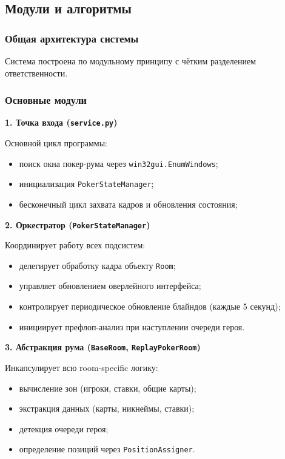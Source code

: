 \subsection{Модули и алгоритмы}

\subsubsection*{Общая архитектура системы}

Система построена по модульному принципу с чётким разделением ответственности.

\subsubsection*{Основные модули}

\textbf{1. Точка входа (\texttt{service.py})}

Основной цикл программы:
\begin{itemize}
    \item поиск окна покер-рума через \texttt{win32gui.EnumWindows};
    \item инициализация \texttt{PokerStateManager};
    \item бесконечный цикл захвата кадров и обновления состояния;
\end{itemize}

\textbf{2. Оркестратор (\texttt{PokerStateManager})}

Координирует работу всех подсистем:
\begin{itemize}
    \item делегирует обработку кадра объекту \texttt{Room};
    \item управляет обновлением оверлейного интерфейса;
    \item контролирует периодическое обновление блайндов (каждые 5 секунд);
    \item инициирует префлоп-анализ при наступлении очереди героя.
\end{itemize}

\textbf{3. Абстракция рума (\texttt{BaseRoom}, \texttt{ReplayPokerRoom})}

Инкапсулирует всю room-specific логику:
\begin{itemize}
    \item вычисление зон (игроки, ставки, общие карты);
    \item экстракция данных (карты, никнеймы, ставки);
    \item детекция очереди героя;
    \item определение позиций через \texttt{PositionAssigner}.
\end{itemize}

